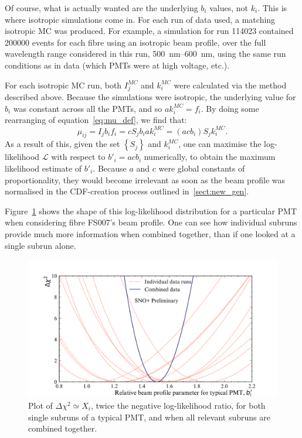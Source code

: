 Of course, what is actually wanted are the underlying $b_{i}$ values, not $k_{i}$. This is where isotropic simulations come in. For each run of data used, a matching isotropic MC was produced. For example, a simulation for run \num{114023} contained \num{200000} events for each fibre using an isotropic beam profile, over the full wavelength range considered in this run, \SIrange{500}{600}{\nano\metre}, using the same run conditions as in data (which PMTs were at high voltage, etc.).

For each isotropic MC run, both $I_{j}^{MC}$ and $k_{i}^{MC}$ were calculated via the method described above. Because the simulations were isotropic, the underlying value for $b_{i}$ was constant across all the PMTs, and so $ak_{i}^{MC} = f_{i}$. By doing some rearranging of equation~\ref{eq:mu_def}, we find that:
\begin{equation}
    \mu_{ij} = I_{j}b_{i}f_{i} = cS_{j}b_{i}ak_{i}^{MC} = (acb_{i})S_{j}k_{i}^{MC}.
\end{equation}
As a result of this, given the set $\left\{S_{j}\right\}$ and $k_{i}^{MC}$, one can maximise the log-likelihood $\mathcal{L}$ with respect to $b'_{i} = acb_{i}$ numerically, to obtain the maximum likelihood estimate of $b'_{i}$. Because $a$ and $c$ were global constants of proportionality, they would become irrelevant as soon as the beam profile was normalised in the CDF-creation process outlined in~\ref{sect:new_gen}.

Figure~\ref{fig:likelihood_scan} shows the shape of this log-likelihood distribution for a particular PMT when considering fibre FS007's beam profile. One can see how individual subruns provide much more information when combined together, than if one looked at a single subrun alone.

\begin{figure}
    \centering
    \includegraphics[width=0.8\linewidth]{5_SMELLIESimulation/images/example_likelihood_distribution_pmt_inc_all_subruns_proper_formatting.pdf}
    \caption{Plot of $\Delta\chi^2\simeq X_{i}$, twice the negative log-likelihood ratio, for both single subruns of a typical PMT, and when all relevant subruns are combined together.}
    \label{fig:likelihood_scan}
\end{figure}

